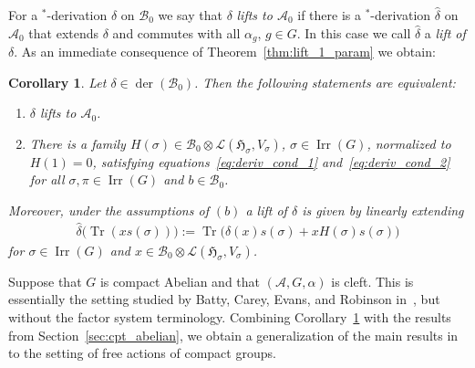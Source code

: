 \documentclass[pdftex]{sigma}
\numberwithin{equation}{section}
\newtheorem{Corollary}[Theorem]{Corollary}
\newcommand*{\tensor}{\otimes}		%
\DeclareMathOperator{\Tr}{Tr}		%
\DeclareMathOperator{\der}{der}
\newcommand*{\Star}{$^*$\nobreakdash}
\newcommand*{\hilb}{\mathfrak}		%
\newcommand*{\alg}{\mathcal}		%
\newcommand*{\hH}{\hilb{H}}			%
\newcommand*{\aA}{\alg{A}}			%
\newcommand*{\aB}{\alg{B}} 			%
\newcommand*{\End}{\mathcal{L}} %
\DeclareMathOperator{\Irrep}{Irr} 			%
\begin{document}
For a \Star-derivation $\delta$ on $\aB_0$ we say that $\delta$ \emph{lifts to $\aA_0$} if there is a \Star-derivation $\hat \delta$ on $\aA_0$ that extends $\delta$ and commutes with all $\alpha_g$, $g \in G$.
In this case we call $\hat \delta$ a \emph{lift of $\delta$}.
As an immediate consequence of Theorem~\ref{thm:lift_1_param} we obtain:
\begin{Corollary}\label{cor:liftder}
	Let $\delta \in \der(\aB_0)$.
	Then the following statements are equivalent:
\begin{enumerate}\itemsep=0pt
\item[$(a)$]
			$\delta$ lifts to $\aA_0$.
\item[$(b)$] %
There is a family $H(\sigma) \in \aB_0 \tensor \End(\hH_\sigma, V_\sigma)$, $\sigma \in \Irrep(G)$, normalized to $H(1)= 0$, satisfying equations~\eqref{eq:deriv_cond_1} and~\eqref{eq:deriv_cond_2} for all $\sigma, \pi \in \Irrep(G)$ and $b \in \aB_0$.
	\end{enumerate}
	Moreover, under the assumptions of $(b)$ a lift of $\delta$ is given by linearly extending
	\begin{gather*}
		\hat \delta\bigl( \Tr ( xs(\sigma) ) \bigr) := \Tr\bigl( \delta(x)s(\sigma) + x H(\sigma) s(\sigma) \bigr)
	\end{gather*}
	for $\sigma \in \Irrep(G)$ and $x \in \aB_0 \tensor \End(\hH_\sigma,V_\sigma)$.
\end{Corollary}

\begin{Remark}\label{rem:cleftAbelian}
Suppose that $G$ is compact Abelian and that $(\aA,G,\alpha)$ is cleft.
This is essentially the setting studied by Batty, Carey, Evans, and Robinson in~\cite{BCER84}, but without the factor system terminology.
Combining Corollary~\ref{cor:liftder} with the results from Section~\ref{sec:cpt_abelian}, we obtain a generalization of the main results in~\cite{BCER84} to the setting of free actions of compact groups.
\end{Remark}
\end{document}
